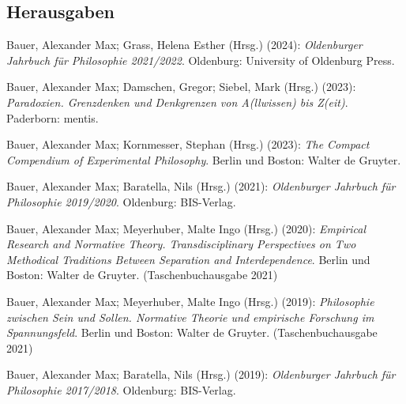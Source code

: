 \documentclass[a4paper,10pt]{article}
\newenvironment{literature}{%
   \parskip6pt\parindent0pt\raggedright
   \def\lititem{\hangindent=1cm\hangafter1}}{%
   \par\ignorespaces}
\begin{document}
\subsection*{Herausgaben}
\begin{literature}
\lititem Bauer, Alexander Max; Grass, Helena Esther (Hrsg.) (2024): \textit{Oldenburger Jahrbuch für Philosophie 2021/2022}. Oldenburg: University of Oldenburg Press.

\lititem Bauer, Alexander Max; Damschen, Gregor; Siebel, Mark (Hrsg.) (2023): \textit{Paradoxien. Grenzdenken und Denkgrenzen von A(llwissen) bis Z(eit)}. Paderborn: mentis.

\lititem Bauer, Alexander Max; Kornmesser, Stephan (Hrsg.) (2023): \textit{The Compact Compendium of Experimental Philosophy}. Berlin und Boston: Walter de Gruyter.

\lititem Bauer, Alexander Max; Baratella, Nils (Hrsg.) (2021): \textit{Oldenburger Jahrbuch für Philosophie 2019/2020}. Oldenburg: BIS-Verlag.

\lititem Bauer, Alexander Max; Meyerhuber, Malte Ingo (Hrsg.) (2020): \textit{Empirical Research and Normative Theory. Transdisciplinary Perspectives on Two Methodical Traditions Between Separation and Interdependence}. Berlin und Boston: Walter de Gruyter. (Taschenbuchausgabe 2021)

\lititem Bauer, Alexander Max; Meyerhuber, Malte Ingo (Hrsg.) (2019): \textit{Philosophie zwischen Sein und Sollen. Normative Theorie und empirische Forschung im Spannungsfeld}. Berlin und Boston: Walter de Gruyter. (Taschenbuchausgabe 2021)

\lititem Bauer, Alexander Max; Baratella, Nils (Hrsg.) (2019): \textit{Oldenburger Jahrbuch für Philosophie 2017/2018}. Oldenburg: BIS-Verlag.
\end{literature}


\end{document}
